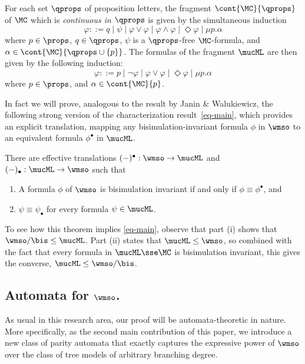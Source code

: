 \begin{definition}
For each set $\qprops$ of
proposition letters, the fragment $\cont{\MC}{\qprops}$ of $\MC$ which is \emph{continuous in $\qprops$}
is given by the simultaneous induction
\begin{equation*}
   \varphi ::= q
   \mid \psi
   \mid \varphi \lor \varphi
   \mid \varphi \land \varphi
   \mid \Diamond \varphi
   \mid \mu p.\alpha
\end{equation*}
where $p\in\props$, $q \in \qprops$, $\psi$ is a $\qprops$-free $\MC$-formula, and
$\alpha \in \cont{\MC}{\qprops\cup\{p\}}$.
%
The formulas of the fragment $\mucML$ are then given by the following induction:
\begin{equation*}
   \varphi ::= p \mid \lnot \varphi
    \mid \varphi \lor \varphi
    \mid  \Diamond \varphi
    \mid \mu p.\alpha
\end{equation*}
where $p \in \props$, and $\alpha \in \cont{\MC}{p}$.
\end{definition}

In fact we will prove, analogous to the result by Janin \& Walukiewicz,
the following strong version of the characterization result~\eqref{eq-main},
which provides an explicit translation, mapping any
bisimulation-invariant formula $\phi$ in $\wmso$ to an equivalent formula
$\phi^{\bullet}$ in $\mucML$.

\begin{theorem}
\label{t:m1}
There are effective translations $(-)^{\bullet}: \wmso \to \mucML$ and
$(-)_{\bullet}: \mucML \to \wmso$ such that 
\begin{enumerate}
\item A formula $\phi$ of $\wmso$ is
bisimulation invariant if and only if $\phi \equiv \phi^{\bullet}$, and
\item $\psi \equiv \psi_{\bullet}$ for every formula $\psi \in \mucML$.
\end{enumerate}
\end{theorem}

To see how this theorem implies \eqref{eq-main}, observe that part (i)
shows that $\wmso/{\bis} \leq \mucML$.
Part (ii) states that $\mucML \leq \wmso$, so combined with the fact that
every formula in $\mucML \sse \MC$ is bisimulation invariant, this gives the
converse, $\mucML \leq \wmso/{\bis}$.



\subsection{Automata for $\wmso$.}
%
As usual in this research area, our proof will be automata-theoretic in
nature.
More specifically, as the second main contribution of this paper, we
introduce a new class of parity automata that exactly captures the expressive
power of $\wmso$ over the class of tree models of arbitrary branching degree.

